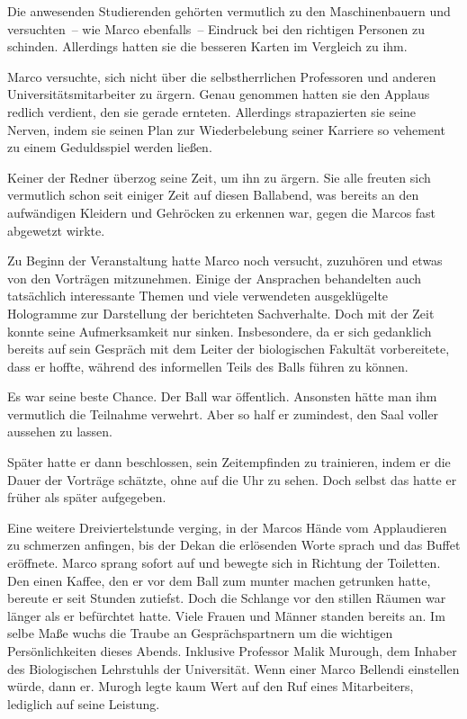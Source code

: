 \par

Die anwesenden Studierenden gehörten vermutlich zu den Maschinenbauern und versuchten~-- wie Marco ebenfalls~-- Eindruck bei den richtigen Personen zu schinden. Allerdings hatten sie die besseren Karten im Vergleich zu ihm.

\par

Marco versuchte, sich nicht über die selbstherrlichen Professoren und anderen Universitätsmitarbeiter zu ärgern. Genau genommen hatten sie den Applaus redlich verdient, den sie gerade ernteten. Allerdings strapazierten sie seine Nerven, indem sie seinen Plan zur Wiederbelebung seiner Karriere so vehement zu einem Geduldsspiel werden ließen.

\par

Keiner der Redner überzog seine Zeit, um ihn zu ärgern. Sie alle freuten sich vermutlich schon seit einiger Zeit auf diesen Ballabend, was bereits an den aufwändigen Kleidern und Gehröcken zu erkennen war, gegen die Marcos fast abgewetzt wirkte.

\par

Zu Beginn der Veranstaltung hatte Marco noch versucht, zuzuhören und etwas von den Vorträgen mitzunehmen. Einige der Ansprachen behandelten auch tatsächlich interessante Themen und viele verwendeten ausgeklügelte Hologramme zur Darstellung der berichteten Sachverhalte. Doch mit der Zeit konnte seine Aufmerksamkeit nur sinken. Insbesondere, da er sich gedanklich bereits auf sein Gespräch mit dem Leiter der biologischen Fakultät vorbereitete, dass er hoffte, während des informellen Teils des Balls führen zu können.

\par

Es war seine beste Chance. Der Ball war öffentlich. Ansonsten hätte man ihm vermutlich die Teilnahme verwehrt. Aber so half er zumindest, den Saal voller aussehen zu lassen.

\par

Später hatte er dann beschlossen, sein Zeitempfinden zu trainieren, indem er die Dauer der Vorträge schätzte, ohne auf die Uhr zu sehen. Doch selbst das hatte er früher als später aufgegeben.

\par

Eine weitere Dreiviertelstunde verging, in der Marcos Hände vom Applaudieren zu schmerzen anfingen, bis der Dekan die erlösenden Worte sprach und das Buffet eröffnete. Marco sprang sofort auf und bewegte sich in Richtung der Toiletten. Den einen Kaffee, den er vor dem Ball zum munter machen getrunken hatte, bereute er seit Stunden zutiefst. Doch die Schlange vor den stillen Räumen war länger als er befürchtet hatte. Viele Frauen und Männer standen bereits an. Im selbe Maße wuchs die Traube an Gesprächspartnern um die wichtigen Persönlichkeiten dieses Abends. Inklusive Professor Malik Murough, dem Inhaber des Biologischen Lehrstuhls der Universität. Wenn einer Marco Bellendi einstellen würde, dann er. Murogh legte kaum Wert auf den Ruf eines Mitarbeiters, lediglich auf seine Leistung.


